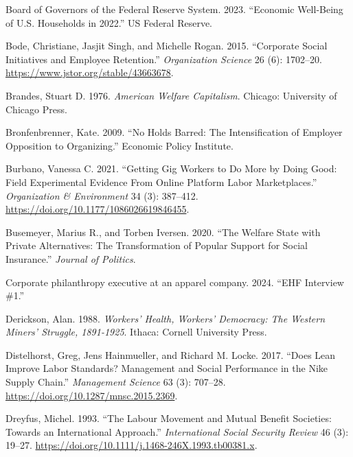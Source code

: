 \documentclass[
  11pt,
  oneside]{article}
\newlength{\cslhangindent}
\newenvironment{CSLReferences}[2] %
 {\begin{list}{}{%
  \setlength{\itemindent}{0pt}
  \setlength{\leftmargin}{0pt}
  \setlength{\parsep}{0pt}
  \ifodd #1
   \setlength{\leftmargin}{\cslhangindent}
   \setlength{\itemindent}{-1\cslhangindent}
  \fi
  \setlength{\itemsep}{#2\baselineskip}}}
 {\end{list}}
\begin{document}
\begin{CSLReferences}{1}{0}
Board of Governors of the Federal Reserve System. 2023. {``Economic {Well-Being} of {U}.{S}. {Households} in 2022.''} {US Federal Reserve}.

Bode, Christiane, Jasjit Singh, and Michelle Rogan. 2015. {``Corporate {Social Initiatives} and {Employee Retention}.''} \emph{Organization Science} 26 (6): 1702--20. \url{https://www.jstor.org/stable/43663678}.

Brandes, Stuart D. 1976. \emph{American {Welfare Capitalism}}. Chicago: University of Chicago Press.

Bronfenbrenner, Kate. 2009. {``No Holds Barred: The Intensification of Employer Opposition to Organizing.''} Economic Policy Institute.

Burbano, Vanessa C. 2021. {``Getting {Gig Workers} to {Do More} by {Doing Good}: {Field Experimental Evidence From Online Platform Labor Marketplaces}.''} \emph{Organization \& Environment} 34 (3): 387--412. \url{https://doi.org/10.1177/1086026619846455}.

Busemeyer, Marius R., and Torben Iversen. 2020. {``The {Welfare} {State} with {Private} {Alternatives}: The Transformation of Popular Support for Social Insurance.''} \emph{Journal of Politics}.

Corporate philanthropy executive at an apparel company. 2024. {``{EHF} Interview \#1.''}

Derickson, Alan. 1988. \emph{Workers' {Health}, {Workers}' {Democracy}: {The} {Western} {Miners}' {Struggle}, 1891-1925}. Ithaca: Cornell University Press.

Distelhorst, Greg, Jens Hainmueller, and Richard M. Locke. 2017. {``Does {Lean} {Improve} {Labor} {Standards}? {Management} and {Social} {Performance} in the {Nike} {Supply} {Chain}.''} \emph{Management Science} 63 (3): 707--28. \url{https://doi.org/10.1287/mnsc.2015.2369}.

Dreyfus, Michel. 1993. {``The Labour Movement and Mutual Benefit Societies: {Towards} an International Approach.''} \emph{International Social Security Review} 46 (3): 19--27. \url{https://doi.org/10.1111/j.1468-246X.1993.tb00381.x}.


\end{CSLReferences}
\end{document}
